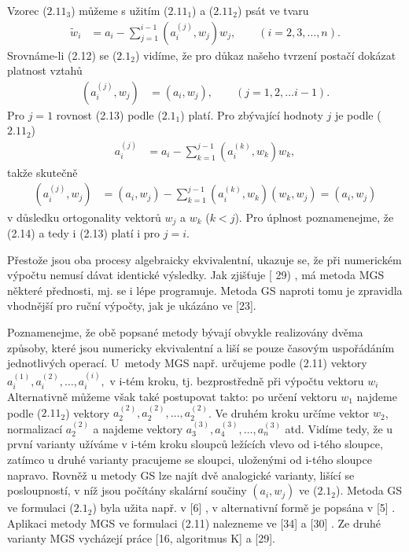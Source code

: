Vzorec ($2.11_3$) můžeme s užitím ($2.11_1$) a ($2.11_2$) psát ve
tvaru
%
\begin{align*}
   \widetilde w_i &= a_i - \sum_{j=1}^{i-1}(a_i^{(j)},w_j)w_j,
                     \qquad (i = 2, 3, \ldots, n).          \tag{2.12}
\end{align*}
%
Srovnáme-li (2.12) se ($2.1_2$) vidíme, že pro důkaz našeho
tvrzení postačí dokázat platnost vztahů
%
\begin{align*}
   (a_i^{(j)},w_j) &= (a_i, w_j), \qquad (j=1,2,\ldots i-1).  \tag{2.13}
\end{align*}
%
Pro $j=1$ rovnost (2.13) podle ($2.1_1$) platí. Pro zbývající
hodnoty $j$ je podle ($2.11_2$)
%
\begin{align*}
   a_i^{(j)} &= a_i - \sum_{k=1}^{j-1}(a_i^{(k)},w_k) w_k,       \tag{2.14}
\end{align*}
%
takže skutečně
%
\begin{align*}
   (a_i^{(j)},w_j) &= (a_i,w_j) - \sum_{k=1}^{j-1}(a_i^{(k)},w_k)(w_k,w_j)
   = (a_i,w_j)                                               \tag{2.15}
\end{align*}
%
v důsledku ortogonality vektorů $w_j$ a $w_k$ ($k<j$). Pro úplnost
poznamenejme, že (2.14) a tedy i (2.13) platí i pro $j=i$.


Přestože jsou oba procesy algebraicky ekvivalentní, ukazuje
se, že při numerickém výpočtu nemusí dávat identické výsledky.
Jak zjišťuje  [ 29) , má metoda MGS některé přednosti, mj.
se i lépe programuje. Metoda GS naproti tomu je zpravidla
vhodnější pro ruční výpočty, jak je ukázáno ve [23].


Poznamenejme, že obě popsané metody bývají obvykle realizovány dvěma
způsoby, které jsou numericky ekvivalentní a liší se pouze časovým
uspořádáním jednotlivých operací. U~metody MGS např. určujeme podle
(2.11) vektory
%
$a_i^{(1)},a_i^{(2)},\ldots,a_i^{(i)},$
%
v i-tém kroku, tj. bezprostředně při výpočtu vektoru
$w_i$ Alternativně můžeme
%
však také postupovat takto:  po určení vektoru $w_1$ najdeme
podle ($2.11_2$) vektory $a_2^{(2)},a_2^{(2)},\ldots,a_2^{(2)}$.
%
Ve druhém kroku určíme vektor $w_2$, normalizací $a_2^{(2)}$ a najdeme
vektory
$a_3^{(3)},a_4^{(3)},\ldots,a_n^{(3)}$
atd.  Vidíme tedy, že u první varianty užíváme v i-tém
kroku sloupců ležících vlevo od i-tého sloupce, zatímco u druhé
varianty pracujeme se sloupci, uloženými od i-tého sloupce napravo.
%
Rovněž u metody GS lze najít dvě analogické varianty, lišící se
posloupností, v níž jsou počítány skalární součiny $(a_i,w_j)$ ve
($2.1_2$). Metoda GS ve formulaci ($2.1_2$) byla užita např. v [6] , v
alternativní formě je popsána v [5] . Aplikaci metody MGS ve formulaci
(2.11) nalezneme ve [34] a [30] . Ze druhé varianty MGS vycházejí
práce [16, algoritmus K] a [29].


